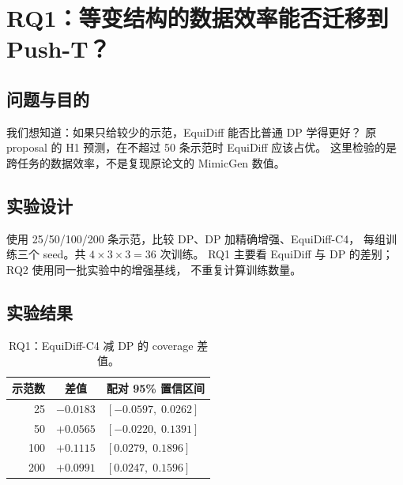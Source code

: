 \section{RQ1：等变结构的数据效率能否迁移到 Push-T？}
\label{eqstudy:zh:rq1}
\subsection{问题与目的}
我们想知道：如果只给较少的示范，EquiDiff 能否比普通 DP 学得更好？
原 proposal 的 H1 预测，在不超过 50 条示范时 EquiDiff 应该占优。
这里检验的是跨任务的数据效率，不是复现原论文的 MimicGen 数值。

\subsection{实验设计}
使用 25/50/100/200 条示范，比较 DP、DP 加精确增强、EquiDiff-C4，
每组训练三个 seed。共 $4\times3\times3=36$ 次训练。
RQ1 主要看 EquiDiff 与 DP 的差别；RQ2 使用同一批实验中的增强基线，
不重复计算训练数量。

\subsection{实验结果}
\begin{table}[htbp]
\centering
\caption{主图像实验 coverage：三个 seed 均值及标准差。粗体仅标记最高均值。}
\label{eqstudy:zh:tab:main}
\end{table}

\begin{table}[htbp]
\centering
\caption{RQ1：EquiDiff-C4 减 DP 的 coverage 差值。}
\label{eqstudy:zh:tab:rq1}
\begin{tabular}{rcl}
\toprule
示范数 & 差值 & 配对 95\% 置信区间 \\
\midrule
25 & $-0.0183$ & $[-0.0597,\;0.0262]$ \\
50 & $+0.0565$ & $[-0.0220,\;0.1391]$ \\
100 & $+0.1115$ & $[0.0279,\;0.1896]$ \\
200 & $+0.0991$ & $[0.0247,\;0.1596]$ \\
\bottomrule
\end{tabular}
\end{table}

